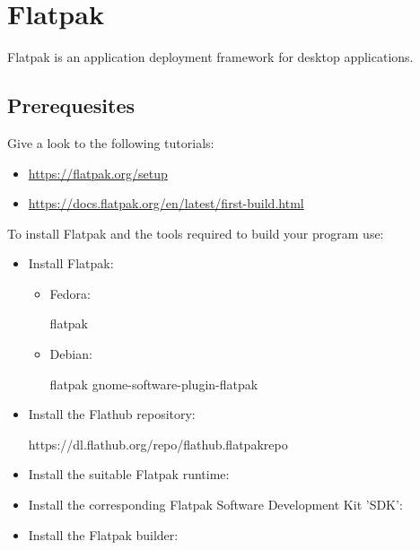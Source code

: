 \section{Flatpak}

Flatpak is an application deployment framework for desktop applications. 

\subsection{Prerequesites}

Give a look to the following tutorials:
\begin{itemize}
\item \href{https://flatpak.org/setup}{https://flatpak.org/setup}
\item \href{https://docs.flatpak.org/en/latest/first-build.html}{https://docs.flatpak.org/en/latest/first-build.html}
\end{itemize}
To install Flatpak and the tools required to build your program use:
\begin{itemize}
\item Install Flatpak: 
\begin{itemize}
\item Fedora: 
{\footnotesize{
\begin{scriptii}
\fprompt{~}    flatpak
\end{scriptii}
}}
\item Debian:
{\footnotesize{
\begin{scriptii}
\uprompt{~}    flatpak
\uprompt{~}    gnome-software-plugin-flatpak
\end{scriptii}
}}
\end{itemize}
\item Install the Flathub repository: 
{\scriptsize{
\begin{scripti}
   https://dl.flathub.org/repo/flathub.flatpakrepo
\end{scripti}
}}
\item Install the suitable Flatpak runtime:
{\footnotesize{
\begin{scripti}
   
\end{scripti}
}}
\item Install the corresponding Flatpak Software Development Kit 'SDK':
{\footnotesize{
\begin{scripti}
   
\end{scripti}
}}
\item Install the Flatpak builder:
{\footnotesize{
\begin{scripti}
   
\end{scripti}
}}
\end{itemize}

